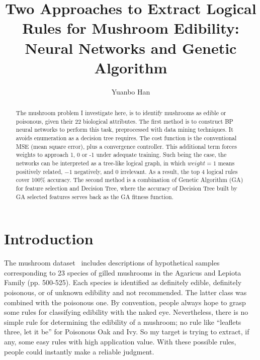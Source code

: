 \documentclass[runningheads]{llncs}
\begin{document}
\title{Two Approaches to Extract Logical Rules for Mushroom Edibility: Neural Networks and Genetic Algorithm}
\author{Yuanbo Han}



\maketitle

\begin{abstract}
The mushroom problem I investigate here, is to identify mushrooms as edible or poisonous, given their 22 biological attributes. The first method is to construct BP neural networks to perform this task, preprocessed with data mining techniques. It avoids enumeration as a decision tree requires. The cost function is the conventional MSE (mean square error), plus a convergence controller. This additional term forces weights to approach 1, 0 or -1 under adequate training. Such being the case, the networks can be interpreted as a tree-like logical graph, in which $weight=1$ means positively related, $-1$ negatively, and $0$ irrelevant. As a result, the top 4 logical rules cover 100\% accuracy. The second method is a combination of Genetic Algorithm (GA) for feature selection and Decision Tree, where the accuracy of Decision Tree built by GA selected features serves back as the GA fitness function.

\end{abstract}

\section{Introduction}
\label{sec-intro}
The mushroom dataset~\cite{lincoff1989audubon} includes descriptions of hypothetical samples corresponding to 23 species of gilled mushrooms in the Agaricus and Lepiota Family (pp. 500-525). Each species is identified as definitely edible, definitely poisonous, or of unknown edibility and not recommended. The latter class was combined with the poisonous one. By convention, people always hope to grasp some rules for classifying edibility with the naked eye. Nevertheless, there is no simple rule for determining the edibility of a mushroom; no rule like ``leaflets three, let it be'' for Poisonous Oak and Ivy. So my target is trying to extract, if any, some easy rules with high application value. With these possible rules, people could instantly make a reliable judgment.
\end{document}
